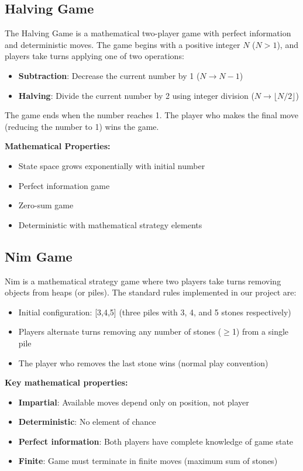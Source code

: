 \documentclass[12pt]{article}
\begin{document}
\subsection{Halving Game}

The Halving Game is a mathematical two-player game with perfect information and deterministic moves. The game begins with a positive integer $N$ ($N > 1$), and players take turns applying one of two operations:

\begin{itemize}
    \item \textbf{Subtraction}: Decrease the current number by 1 ($N \rightarrow N-1$)
    \item \textbf{Halving}: Divide the current number by 2 using integer division ($N \rightarrow \lfloor N/2 \rfloor$)
\end{itemize}

The game ends when the number reaches 1. The player who makes the final move (reducing the number to 1) wins the game.

\textbf{Mathematical Properties:}
\begin{itemize}
    \item State space grows exponentially with initial number
    \item Perfect information game
    \item Zero-sum game
    \item Deterministic with mathematical strategy elements
\end{itemize}

\subsection{Nim Game}

Nim is a mathematical strategy game where two players take turns removing objects from heaps (or piles). The standard rules implemented in our project are:

\begin{itemize}
    \item Initial configuration: [3,4,5] (three piles with 3, 4, and 5 stones respectively)
    \item Players alternate turns removing any number of stones ($\geq$1) from a single pile
    \item The player who removes the last stone wins (normal play convention)
\end{itemize}

\textbf{Key mathematical properties:}
\begin{itemize}
    \item \textbf{Impartial}: Available moves depend only on position, not player
    \item \textbf{Deterministic}: No element of chance
    \item \textbf{Perfect information}: Both players have complete knowledge of game state
    \item \textbf{Finite}: Game must terminate in finite moves (maximum sum of stones)
\end{itemize}
\end{document}
